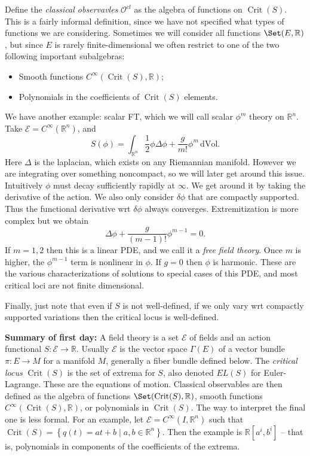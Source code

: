 \begin{definition}\label{1.0.1}
	Define the \emph{classical observavles} $\mathcal{O} ^{cl} $ as the algebra of functions on $\operatorname{Crit} (S)$. This is a fairly informal definition, since we have not specified what types of functions we are considering. Sometimes we will consider all functions $\Set (E,\mathbb{R} )$, but since $E$ is rarely finite-dimensional we often restrict to one of the two following important subalgebras:
	\begin{itemize}
		\item Smooth functions $C^\infty (\operatorname{Crit} (S),\mathbb{R} )$;
		\item Polynomials in the coefficients of $\operatorname{Crit} (S)$ elements.
	\end{itemize}
\end{definition}

We have another example: scalar FT, which we will call scalar $\phi ^m$ theory on $\mathbb{R} ^n$. Take $\mathcal{E} =C^\infty (\mathbb{R} ^n)$, and
\[
	S(\phi )=\int_{\mathbb{R} ^n}\frac{1}{2} \phi \Delta \phi +\frac{g}{m!} \phi ^m \,\mathrm{d} \mathrm{Vol} 
.\]
Here $\Delta $ is the laplacian, which exists on any Riemannian manifold. However we are integrating over something noncompact, so we will later get around this issue. Intuitively $\phi $ must decay sufficiently rapidly at $\infty $. We get around it by taking the derivative of the action. We also only consider $\delta \phi $ that are compactly supported. Thus the functional derivative wrt $\delta \phi $ always converges. Extremitization is more complex but we obtain
\[
	\Delta \phi +\frac{g}{(m-1)!} \phi ^{m-1} =0
.\]
If $m=1,2$ then this is a linear PDE, and we call it a \emph{free field theory}. Once $m$ is higher, the $\phi ^{m-1} $ term is nonlinear in $\phi $. If $g=0$ then $\phi $ is harmonic. These are the various characterizations of solutions to special cases of this PDE, and most critical loci are not finite dimensional.

Finally, just note that even if $S$ is not well-defined, if we only vary wrt compactly supported variations then the critical locus is well-defined.

\textbf{Summary of first day:} A field theory is a set $\mathcal{E} $ of fields and an action functional $S : \mathcal{E}  \to \mathbb{R} $. Usually $\mathcal{E} $ is the vector space $\Gamma (E)$ of a vector bundle $\pi : E \to M$ for a manifold $M$, generally a fiber bundle defined below. The \emph{critical locus} $\operatorname{Crit} (S)$ is the set of extrema for $S$, also denoted $EL(S)$ for Euler-Lagrange. These are the equations of motion. Classical observables are then defined as the algebra of functions $\Set (\operatorname{Crit} (S),\mathbb{R} )$, smooth functions $C^\infty (\operatorname{Crit} (S),\mathbb{R} )$, or polynomials in $\operatorname{Crit} (S)$. The way to interpret the final one is less formal. For an example, let $\mathcal{E} =C^\infty (I,\mathbb{R} ^n)$ such that $\operatorname{Crit} (S)=\left\{ q(t)=at+b\mid a,b\in\mathbb{R} ^n \right\} $. Then the example is $\mathbb{R} [a^i,b^i]$ -- that is, polynomials in components of the coefficients of the extrema.

